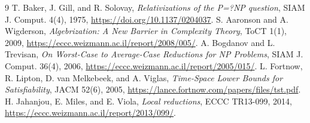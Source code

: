 \documentclass[11pt]{article}
\begin{document}
\begin{thebibliography}{9}
 T. Baker, J. Gill, and R. Solovay,
\emph{Relativizations of the P=?NP question}, SIAM J. Comput. 4(4), 1975,
\url{https://doi.org/10.1137/0204037}.
 S. Aaronson and A. Wigderson,
\emph{Algebrization: A New Barrier in Complexity Theory}, ToCT 1(1), 2009,
\url{https://eccc.weizmann.ac.il/report/2008/005/}.
 A. Bogdanov and L. Trevisan,
\emph{On Worst-Case to Average-Case Reductions for NP Problems},
SIAM J. Comput. 36(4), 2006,
\url{https://eccc.weizmann.ac.il/report/2005/015/}.
 L. Fortnow, R. Lipton, D. van Melkebeek, and A. Viglas,
\emph{Time-Space Lower Bounds for Satisfiability}, JACM 52(6), 2005,
\url{https://lance.fortnow.com/papers/files/tst.pdf}.
 H. Jahanjou, E. Miles, and E. Viola,
\emph{Local reductions}, ECCC TR13-099, 2014,
\url{https://eccc.weizmann.ac.il/report/2013/099/}.
\end{thebibliography}

\end{document}
